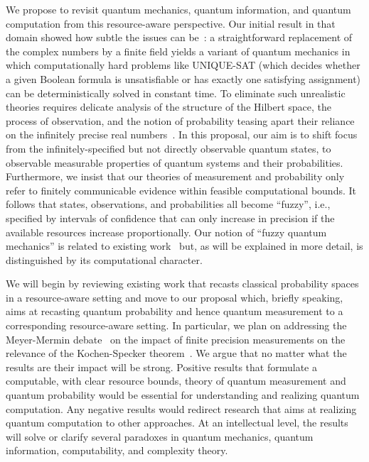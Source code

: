 \documentclass{article}
\theoremstyle{remark}
\begin{document}
We propose to revisit quantum mechanics, quantum information, and
quantum computation from this resource-aware perspective. Our initial
result in that domain showed how subtle the issues can be~\cite{usat}:
a straightforward replacement of the complex numbers by a finite field
yields a variant of quantum mechanics in which computationally hard
problems like UNIQUE-SAT (which decides whether a given Boolean
formula is unsatisfiable or has exactly one satisfying assignment) can
be deterministically solved in constant time. To eliminate such
unrealistic theories requires delicate analysis of the structure of
the Hilbert space, the process of observation, and the notion of
probability teasing apart their reliance on the infinitely precise
real numbers~\cite{geometry2013,DQT2014}. In this proposal, our aim is
to shift focus from the infinitely-specified but not directly
observable quantum states, to observable measurable properties of
quantum systems and their probabilities. Furthermore, we insist that
our theories of measurement and probability only refer to finitely
communicable evidence within feasible computational bounds. It follows
that states, observations, and probabilities all become ``fuzzy'',
i.e., specified by intervals of confidence that can only increase in
precision if the available resources increase proportionally. Our
notion of ``fuzzy quantum mechanics'' is related to existing
work~\cite{GranikCaulfield1996,Pykacz2013,SNL2009,Gudder2005,aerts1993physical}
but, as will be explained in more detail, is distinguished by its
computational character.

We will begin by reviewing existing work that recasts classical
probability spaces in a resource-aware setting and move to our
proposal which, briefly speaking, aims at recasting quantum
probability and hence quantum measurement to a corresponding
resource-aware setting. In particular, we plan on addressing the
Meyer-Mermin debate~\cite{PhysRevLett.83.3751, Mermin1999,
  BarrettKent2004} on the impact of finite precision measurements on
the relevance of the Kochen-Specker
theorem~\cite{kochenspecker1967,Redhead1987-REDINA,peres1995quantum,Jaeger2007}.
We argue that no matter
what the results are their impact will be strong. Positive results
that formulate a computable, with clear resource bounds, theory of
quantum measurement and quantum probability would be essential for
understanding and realizing quantum computation. Any negative results
would redirect research that aims at realizing quantum computation to
other approaches. At an intellectual level, the results will solve or
clarify several paradoxes in quantum mechanics, quantum information,
computability, and complexity theory.
\end{document}
